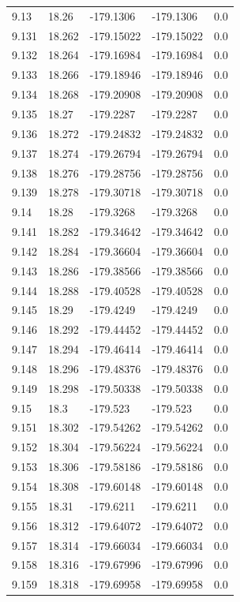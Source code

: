 \begin{tabular}{lllll}
9.13 & 18.26 & -179.1306 & -179.1306 & 0.0 \\
9.131 & 18.262 & -179.15022 & -179.15022 & 0.0 \\
9.132 & 18.264 & -179.16984 & -179.16984 & 0.0 \\
9.133 & 18.266 & -179.18946 & -179.18946 & 0.0 \\
9.134 & 18.268 & -179.20908 & -179.20908 & 0.0 \\
9.135 & 18.27 & -179.2287 & -179.2287 & 0.0 \\
9.136 & 18.272 & -179.24832 & -179.24832 & 0.0 \\
9.137 & 18.274 & -179.26794 & -179.26794 & 0.0 \\
9.138 & 18.276 & -179.28756 & -179.28756 & 0.0 \\
9.139 & 18.278 & -179.30718 & -179.30718 & 0.0 \\
9.14 & 18.28 & -179.3268 & -179.3268 & 0.0 \\
9.141 & 18.282 & -179.34642 & -179.34642 & 0.0 \\
9.142 & 18.284 & -179.36604 & -179.36604 & 0.0 \\
9.143 & 18.286 & -179.38566 & -179.38566 & 0.0 \\
9.144 & 18.288 & -179.40528 & -179.40528 & 0.0 \\
9.145 & 18.29 & -179.4249 & -179.4249 & 0.0 \\
9.146 & 18.292 & -179.44452 & -179.44452 & 0.0 \\
9.147 & 18.294 & -179.46414 & -179.46414 & 0.0 \\
9.148 & 18.296 & -179.48376 & -179.48376 & 0.0 \\
9.149 & 18.298 & -179.50338 & -179.50338 & 0.0 \\
9.15 & 18.3 & -179.523 & -179.523 & 0.0 \\
9.151 & 18.302 & -179.54262 & -179.54262 & 0.0 \\
9.152 & 18.304 & -179.56224 & -179.56224 & 0.0 \\
9.153 & 18.306 & -179.58186 & -179.58186 & 0.0 \\
9.154 & 18.308 & -179.60148 & -179.60148 & 0.0 \\
9.155 & 18.31 & -179.6211 & -179.6211 & 0.0 \\
9.156 & 18.312 & -179.64072 & -179.64072 & 0.0 \\
9.157 & 18.314 & -179.66034 & -179.66034 & 0.0 \\
9.158 & 18.316 & -179.67996 & -179.67996 & 0.0 \\
9.159 & 18.318 & -179.69958 & -179.69958 & 0.0 \\

\end{tabular}
